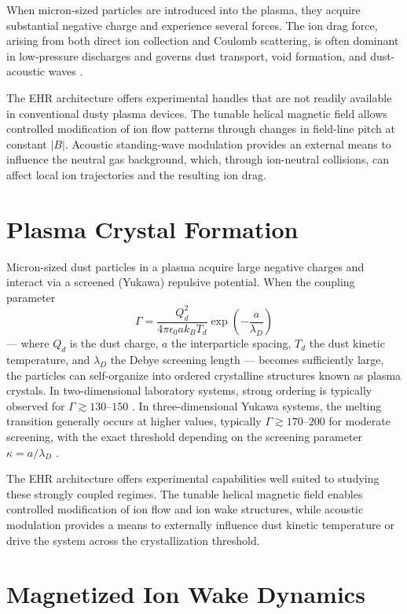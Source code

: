 \documentclass[11pt]{article}
\begin{document}
When micron-sized particles are introduced into the plasma, they acquire substantial negative charge and experience several forces. The ion drag force, arising from both direct ion collection and Coulomb scattering, is often dominant in low-pressure discharges and governs dust transport, void formation, and dust-acoustic waves \cite{goree2020}.

The EHR architecture offers experimental handles that are not readily available in conventional dusty plasma devices. The tunable helical magnetic field allows controlled modification of ion flow patterns through changes in field-line pitch at constant $|B|$. Acoustic standing-wave modulation provides an external means to influence the neutral gas background, which, through ion-neutral collisions, can affect local ion trajectories and the resulting ion drag.

\section{Plasma Crystal Formation}

Micron-sized dust particles in a plasma acquire large negative charges and interact via a screened (Yukawa) repulsive potential. When the coupling parameter
\begin{equation}
\Gamma = \frac{Q_d^2}{4\pi\epsilon_0 a k_B T_d} \exp\left( -\frac{a}{\lambda_D} \right)
\end{equation}
--- where $Q_d$ is the dust charge, $a$ the interparticle spacing, $T_d$ the dust kinetic temperature, and $\lambda_D$ the Debye screening length --- becomes sufficiently large, the particles can self-organize into ordered crystalline structures known as plasma crystals. In two-dimensional laboratory systems, strong ordering is typically observed for $\Gamma \gtrsim 130$--$150$ \cite{melzer1996}. In three-dimensional Yukawa systems, the melting transition generally occurs at higher values, typically $\Gamma \gtrsim 170$--$200$ for moderate screening, with the exact threshold depending on the screening parameter $\kappa = a / \lambda_D$ \cite{hamaguchi1997}.

The EHR architecture offers experimental capabilities well suited to studying these strongly coupled regimes. The tunable helical magnetic field enables controlled modification of ion flow and ion wake structures, while acoustic modulation provides a means to externally influence dust kinetic temperature or drive the system across the crystallization threshold.

\section{Magnetized Ion Wake Dynamics}
\end{document}
